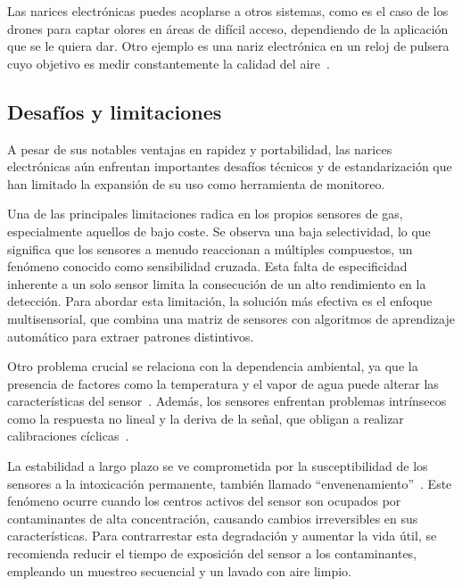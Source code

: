 Las narices electrónicas puedes acoplarse a otros sistemas, como es el caso de los drones para captar olores en áreas de difícil acceso, dependiendo de la aplicación que se le quiera dar. Otro ejemplo es una nariz electrónica en un reloj de pulsera cuyo objetivo es medir constantemente la calidad del aire~\cite{ArroyoMelendezSuarez2020}.

\subsection{Desafíos y limitaciones}
A pesar de sus notables ventajas en rapidez y portabilidad, las narices electrónicas aún enfrentan importantes desafíos técnicos y de estandarización que han limitado la expansión de su uso como herramienta de monitoreo.
\par

Una de las principales limitaciones radica en los propios sensores de gas, especialmente aquellos de bajo coste. Se observa una baja selectividad, lo que significa que los sensores a menudo reaccionan a múltiples compuestos, un fenómeno conocido como sensibilidad cruzada. Esta falta de especificidad inherente a un solo sensor limita la consecución de un alto rendimiento en la detección. Para abordar esta limitación, la solución más efectiva es el enfoque multisensorial, que combina una matriz de sensores con algoritmos de aprendizaje automático para extraer patrones distintivos.
\par

Otro problema crucial se relaciona con la dependencia ambiental, ya que la presencia de factores como la temperatura y el vapor de agua puede alterar las características del sensor~\cite{RomainNicolas2010}. Además, los sensores enfrentan problemas intrínsecos como la respuesta no lineal y la deriva de la señal, que obligan a realizar calibraciones cíclicas~\cite{Rudnitskaya2018}.
\par

La estabilidad a largo plazo se ve comprometida por la susceptibilidad de los sensores a la intoxicación permanente, también llamado ``envenenamiento''~\cite{MarcoGutierrez2012}. Este fenómeno ocurre cuando los centros activos del sensor son ocupados por contaminantes de alta concentración, causando cambios irreversibles en sus características. Para contrarrestar esta degradación y aumentar la vida útil, se recomienda reducir el tiempo de exposición del sensor a los contaminantes, empleando un muestreo secuencial y un lavado con aire limpio.
\par

